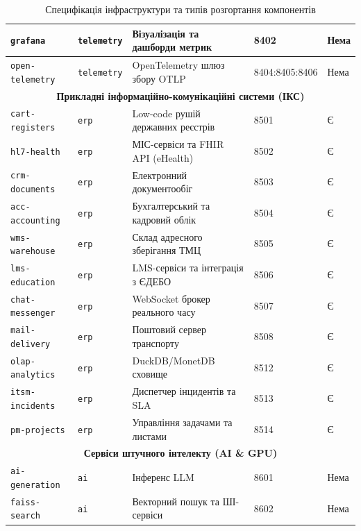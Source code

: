 \documentclass{article}
\begin{document}
\begin{table}[h!]
\begin{tabular}{|l|l|p{5cm}|l|l|}
\texttt{grafana}           & \texttt{telemetry} & Візуалізація та дашборди метрик   & 8402 & Нема \\ \hline
\texttt{open-telemetry}    & \texttt{telemetry} & OpenTelemetry шлюз збору OTLP     & 8404:8405:8406 & Нема \\ \hline
\hline
\multicolumn{5}{|c|}{\textbf{Прикладні інформаційно-комунікаційні системи (ІКС)}} \\ \hline
\texttt{cart-registers}    & \texttt{erp}       & Low-code рушій державних реєстрів & 8501 & Є \\ \hline
\texttt{hl7-health}        & \texttt{erp}       & МІС-сервіси та FHIR API (eHealth) & 8502 & Є \\ \hline
\texttt{crm-documents}     & \texttt{erp}       & Електронний документообіг         & 8503 & Є \\ \hline
\texttt{acc-accounting}    & \texttt{erp}       & Бухгалтерський та кадровий облік  & 8504 & Є \\ \hline
\texttt{wms-warehouse}     & \texttt{erp}       & Склад адресного зберігання ТМЦ    & 8505 & Є \\ \hline
\texttt{lms-education}     & \texttt{erp}       & LMS-сервіси та інтеграція з ЄДЕБО & 8506 & Є \\ \hline
\texttt{chat-messenger}    & \texttt{erp}       & WebSocket брокер реального часу   & 8507 & Є \\ \hline
\texttt{mail-delivery}     & \texttt{erp}       & Поштовий сервер транспорту        & 8508 & Є \\ \hline
\texttt{olap-analytics}    & \texttt{erp}       & DuckDB/MonetDB сховище            & 8512 & Є \\ \hline
\texttt{itsm-incidents}    & \texttt{erp}       & Диспетчер інцидентів та SLA       & 8513 & Є \\ \hline
\texttt{pm-projects}       & \texttt{erp}       & Управління задачами та листами    & 8514 & Є \\ \hline
\hline
\multicolumn{5}{|c|}{\textbf{Сервіси штучного інтелекту (AI \& GPU)}} \\ \hline
\texttt{ai-generation} & \texttt{ai} &  Інференс LLM & 8601 & Нема \\ \hline
\texttt{faiss-search} & \texttt{ai} & Векторний пошук та ШІ-сервіси & 8602 & Нема \\ \hline
\end{tabular}
\caption{Специфікація інфраструктури та типів розгортання компонентів}
\label{tab:infrastructure}
\end{table}
\end{document}

